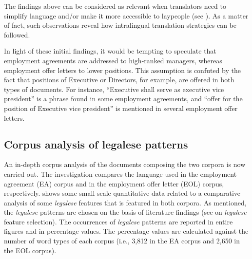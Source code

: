 \documentclass[output=paper]{langscibook}
\begin{document}
The findings above can be considered as relevant when translators need to simplify language and/or make it more accessible to laypeople (see \citealt{StoddenEtAl2023}). As a matter of fact, such observations reveal how intralingual translation strategies can be followed.

In light of these initial findings, it would be tempting to speculate that employment agreements are addressed to high-ranked managers, whereas employment offer letters to lower positions. This assumption is confuted by the fact that positions of Executive or Directors, for example, are offered in both types of documents. For instance, “Executive shall serve as executive vice president” is a phrase found in some employment agreements, and “offer for the position of Executive vice president” is mentioned in several employment offer letters.

\subsection{Corpus analysis of legalese patterns}\label{sec:giampieri:4.2}

An in-depth corpus analysis of the documents composing the two corpora is now carried out. The investigation compares the language used in the employment agreement (EA) corpus and in the employment offer letter (EOL) corpus, respectively.   shows some small-scale quantitative data related to a comparative analysis of some \textit{legalese} features that is featured in both corpora. As mentioned, the \textit{legalese} patterns are chosen on the basis of literature findings (see  on \textit{legalese} feature selection). The occurrences of \textit{legalese} patterns are reported in entire figures and in percentage values. The percentage values are calculated against the number of word types of each corpus (i.e., 3,812 in the EA corpus and 2,650 in the EOL corpus).
\end{document}
